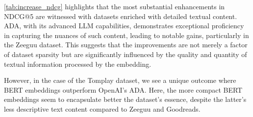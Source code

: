 \autoref{tab:increase_ndcg} highlights that the most substantial enhancements in NDCG@5 are witnessed with datasets enriched with detailed textual content. ADA, with its advanced LLM capabilities, demonstrates exceptional proficiency in capturing the nuances of such content, leading to notable gains, particularly in the  Zeeguu dataset. This suggests that the improvements are not merely a factor of dataset sparsity but are significantly influenced by the quality and quantity of textual information processed by the embedding. 

However, in the case of the Tomplay dataset, we see a unique outcome where BERT embeddings outperform OpenAI's ADA. Here, the more compact BERT embeddings seem to encapsulate better the dataset's essence, despite the latter's less descriptive text content compared to Zeeguu and Goodreads. 

